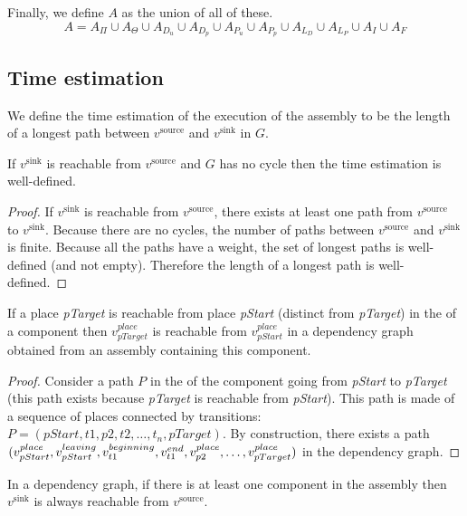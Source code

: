 Finally, we define $A$ as the union of all of these. 
\[
A=A_\Pi\cup A_{\Theta}\cup A_{D_{u}}\cup A_{D_{p}}\cup A_{P_{u}}\cup A_{P_{p}}\cup A_{L_{D}}\cup A_{L_{P}}\cup A_{I}\cup A_{F}
\]


\subsection{Time estimation}

We define the time estimation of the execution of the \mad assembly
to be the length of a longest path between $v^\text{source}$ and
$v^\text{sink}$ in $G$.

\begin{property}
If $v^\text{sink}$ is reachable from $v^\text{source}$ and $G$ has no
cycle then the time estimation is well-defined.
\end{property}

\begin{proof}
 If $v^\text{sink}$ is reachable from $v^\text{source}$, there exists at least
 one path from $v^\text{source}$ to  $v^\text{sink}$. Because there are no
 cycles, the number of paths between $v^\text{source}$ and $v^\text{sink}$ is
 finite. Because all the paths have a weight, the set of longest paths is
 well-defined (and not empty). Therefore the length of a longest path is
 well-defined.
\end{proof}

\begin{property}
  If a place \emph{pTarget} is reachable from place \emph{pStart} (distinct
  from \emph{pTarget}) in the \net of a component then $v_{pTarget}^{place}$ is reachable
  from $v_{pStart}^{place}$ in a dependency graph obtained from an assembly
  containing this component.
  \label{propertyReachable}
\end{property}

\begin{proof}
 Consider a path $P$ in the \net of the component going from \emph{pStart} to
 \emph{pTarget} (this path exists because \emph{pTarget} is reachable from
 \emph{pStart}). This path is made of a sequence of places connected by
 transitions: $P=(pStart,t1,p2,t2,\dots,t_n,pTarget)$. By construction,
 there exists a path $(v_{pStart}^{place},v_{pStart}^{leaving},v_{t1}^{beginning},v_{t1}^{end},v_{p2}^{place},\dots,\\v_{pTarget}^{place})$ in the dependency graph.
\end{proof}


\begin{property}
In a \mad dependency graph, if there is at least one component in the
assembly then $v^\text{sink}$ is always reachable from $v^\text{source}$.
\end{property}

